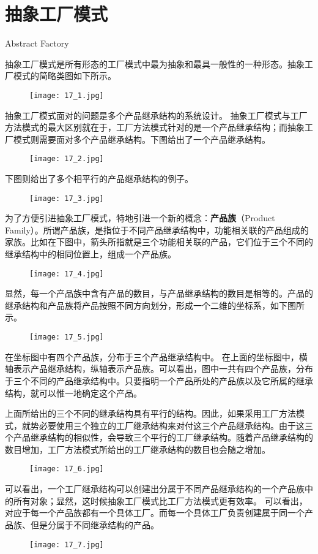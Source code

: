 \documentclass[../main.tex]{subfiles}
\begin{document}
\section{抽象工厂模式}
Abstract Factory

抽象工厂模式是所有形态的工厂模式中最为抽象和最具一般性的一种形态。抽象工厂模式的简略类图如下所示。
\begin{figure}[H]
  \texttt{[image: 17\_1.jpg]}
\end{figure}
%
抽象工厂模式面对的问题是多个产品继承结构的系统设计。
抽象工厂模式与工厂方法模式的最大区别就在于，工厂方法模式针对的是一个产品继承结构；而抽象工厂模式则需要面对多个产品继承结构。下图给出了一个产品继承结构。
\begin{figure}[H]
  \texttt{[image: 17\_2.jpg]}
\end{figure}
%
下图则给出了多个相平行的产品继承结构的例子。
\begin{figure}[H]
  \texttt{[image: 17\_3.jpg]}
\end{figure}
%
为了方便引进抽象工厂模式，特地引进一个新的概念：\textbf{产品族}（Product Family）。所谓产品族，是指位于不同产品继承结构中，功能相关联的产品组成的家族。比如在下图中，箭头所指就是三个功能相关联的产品，它们位于三个不同的继承结构中的相同位置上，组成一个产品族。
\begin{figure}[H]
  \texttt{[image: 17\_4.jpg]}
\end{figure}
显然，每一个产品族中含有产品的数目，与产品继承结构的数目是相等的。产品的继承结构和产品族将产品按照不同方向划分，形成一个二维的坐标系，如下图所示。
\begin{figure}[H]
  \texttt{[image: 17\_5.jpg]}
\end{figure}
%
在坐标图中有四个产品族，分布于三个产品继承结构中。
在上面的坐标图中，横轴表示产品继承结构，纵轴表示产品族。可以看出，图中一共有四个产品族，分布于三个不同的产品继承结构中。只要指明一个产品所处的产品族以及它所属的继承结构，就可以惟一地确定这个产品。

上面所给出的三个不同的继承结构具有平行的结构。因此，如果采用工厂方法模式，就势必要使用三个独立的工厂继承结构来对付这三个产品继承结构。由于这三个产品继承结构的相似性，会导致三个平行的工厂继承结构。随着产品继承结构的数目增加，工厂方法模式所给出的工厂继承结构的数目也会随之增加。
%
\begin{figure}[H]
  \texttt{[image: 17\_6.jpg]}
\end{figure}
%
可以看出，一个工厂继承结构可以创建出分属于不同产品继承结构的一个产品族中的所有对象；显然，这时候抽象工厂模式比工厂方法模式更有效率。
可以看出，对应于每一个产品族都有一个具体工厂。而每一个具体工厂负责创建属于同一个产品族、但是分属于不同继承结构的产品。
%
\begin{figure}[H]
  \texttt{[image: 17\_7.jpg]}
\end{figure}
%
\end{document}

